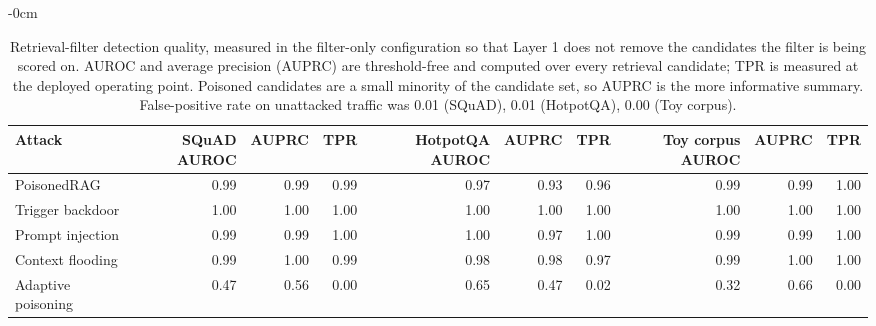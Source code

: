 \begin{table}[t]
\begin{adjustwidth}{-\extralength}{0cm}
\footnotesize
\setlength{\tabcolsep}{3pt}
\caption{Retrieval-filter detection quality, measured in the filter-only configuration so that Layer 1 does not remove the candidates the filter is being scored on. AUROC and average precision (AUPRC) are threshold-free and computed over every retrieval candidate; TPR is measured at the deployed operating point. Poisoned candidates are a small minority of the candidate set, so AUPRC is the more informative summary. False-positive rate on unattacked traffic was 0.01 (SQuAD), 0.01 (HotpotQA), 0.00 (Toy corpus).\label{tab:detection}}
\begin{tabular}{lrrrrrrrrr}
\toprule
\textbf{Attack} & \textbf{SQuAD AUROC} & \textbf{AUPRC} & \textbf{TPR} & \textbf{HotpotQA AUROC} & \textbf{AUPRC} & \textbf{TPR} & \textbf{Toy corpus AUROC} & \textbf{AUPRC} & \textbf{TPR}\\
\midrule
PoisonedRAG & 0.99 & 0.99 & 0.99 & 0.97 & 0.93 & 0.96 & 0.99 & 0.99 & 1.00\\
Trigger backdoor & 1.00 & 1.00 & 1.00 & 1.00 & 1.00 & 1.00 & 1.00 & 1.00 & 1.00\\
Prompt injection & 0.99 & 0.99 & 1.00 & 1.00 & 0.97 & 1.00 & 0.99 & 0.99 & 1.00\\
Context flooding & 0.99 & 1.00 & 0.99 & 0.98 & 0.98 & 0.97 & 0.99 & 1.00 & 1.00\\
Adaptive poisoning & 0.47 & 0.56 & 0.00 & 0.65 & 0.47 & 0.02 & 0.32 & 0.66 & 0.00\\
\bottomrule
\end{tabular}
\end{adjustwidth}
\end{table}
